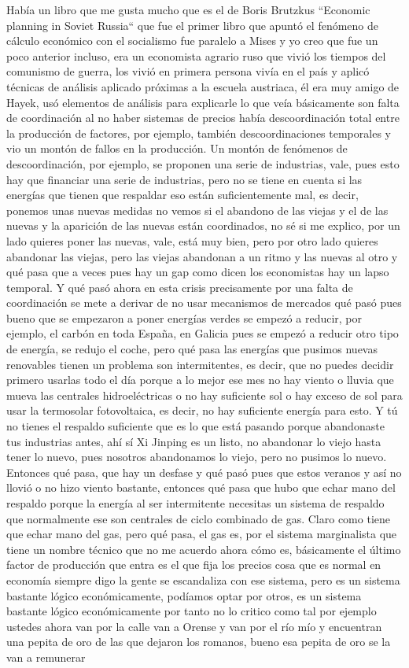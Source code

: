 Había un libro que me gusta mucho que es el de Boris Brutzkus ``Economic planning in Soviet Russia`` que fue el primer libro que apuntó el fenómeno de cálculo económico con el socialismo fue paralelo a Mises y yo creo que fue un poco anterior incluso, era un economista agrario ruso que vivió los tiempos del comunismo de guerra, los vivió en primera persona vivía en el país y aplicó técnicas de análisis aplicado próximas a la escuela austriaca, él era muy amigo de Hayek, usó elementos de análisis para explicarle lo que veía básicamente son falta de coordinación al no haber sistemas de precios había descoordinación total entre la producción de factores, por ejemplo, también descoordinaciones temporales y vio un montón de fallos en la producción. Un montón de fenómenos de descoordinación, por ejemplo, se proponen una serie de industrias, vale, pues esto hay que financiar una serie de industrias, pero no se tiene en cuenta si las energías que tienen que respaldar eso están suficientemente mal, es decir, ponemos unas nuevas medidas no vemos si el abandono de las viejas y el de las nuevas y la aparición de las nuevas están coordinados, no sé si me explico, por un lado quieres poner las nuevas, vale, está muy bien, pero por otro lado quieres abandonar las viejas, pero las viejas abandonan a un ritmo y las nuevas al otro y qué pasa que a veces pues hay un gap como dicen los economistas hay un lapso temporal. Y qué pasó ahora en esta crisis precisamente por una falta de coordinación se mete a derivar de no usar mecanismos de mercados qué pasó pues bueno que se empezaron a poner energías verdes se empezó a reducir, por ejemplo, el carbón en toda España, en Galicia pues se empezó a reducir otro tipo de energía, se redujo el coche, pero qué pasa las energías que pusimos nuevas renovables tienen un problema son intermitentes, es decir, que no puedes decidir primero usarlas todo el día porque a lo mejor ese mes no hay viento o lluvia que mueva las centrales hidroeléctricas o no hay suficiente sol o hay exceso de sol para usar la termosolar fotovoltaica, es decir, no hay suficiente energía para esto. Y tú no tienes el respaldo suficiente que es lo que está pasando porque abandonaste tus industrias antes, ahí sí Xi Jinping es un listo, no abandonar lo viejo hasta tener lo nuevo, pues nosotros abandonamos lo viejo, pero no pusimos lo nuevo. Entonces qué pasa, que hay un desfase y qué pasó pues que estos veranos y así no llovió o no hizo viento bastante, entonces qué pasa que hubo que echar mano del respaldo porque la energía al ser intermitente necesitas un sistema de respaldo que normalmente ese son centrales de ciclo combinado de gas. Claro como tiene que echar mano del gas, pero qué pasa, el gas es, por el sistema marginalista que tiene un nombre técnico que no me acuerdo ahora cómo es, básicamente el último factor de producción que entra es el que fija los precios cosa que es normal en economía siempre digo la gente se escandaliza con ese sistema, pero es un sistema bastante lógico económicamente, podíamos optar por otros, es un sistema bastante lógico económicamente por tanto no lo critico como tal por ejemplo ustedes ahora van por la calle van a Orense y van por el río mío y encuentran una pepita de oro de las que dejaron los romanos, bueno esa pepita de oro se la van a remunerar 